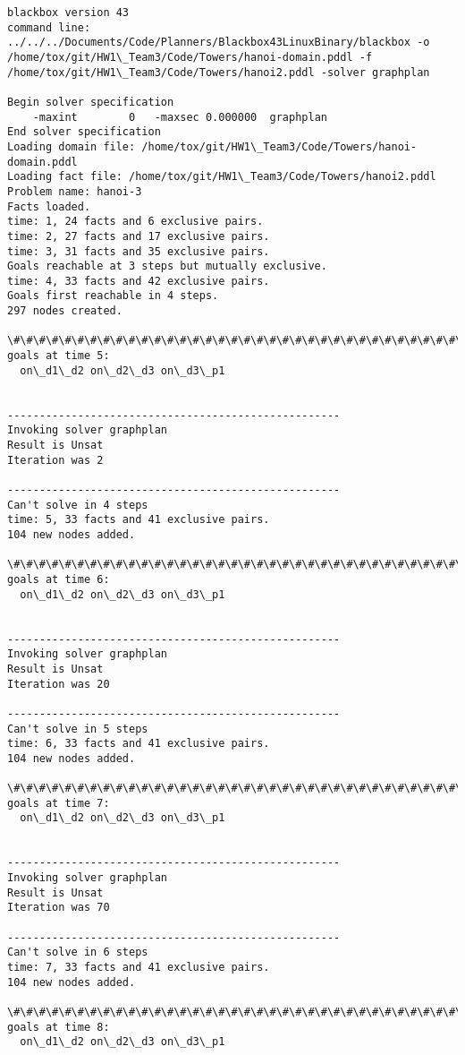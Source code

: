 \documentclass{article}
\begin{document}
    \begin{Verbatim}[commandchars=\\\{\}]
blackbox version 43
command line:  ../../../Documents/Code/Planners/Blackbox43LinuxBinary/blackbox -o /home/tox/git/HW1\_Team3/Code/Towers/hanoi-domain.pddl -f /home/tox/git/HW1\_Team3/Code/Towers/hanoi2.pddl -solver graphplan

Begin solver specification
    -maxint        0   -maxsec 0.000000  graphplan
End solver specification
Loading domain file: /home/tox/git/HW1\_Team3/Code/Towers/hanoi-domain.pddl
Loading fact file: /home/tox/git/HW1\_Team3/Code/Towers/hanoi2.pddl
Problem name: hanoi-3
Facts loaded.
time: 1, 24 facts and 6 exclusive pairs.
time: 2, 27 facts and 17 exclusive pairs.
time: 3, 31 facts and 35 exclusive pairs.
Goals reachable at 3 steps but mutually exclusive.
time: 4, 33 facts and 42 exclusive pairs.
Goals first reachable in 4 steps.
297 nodes created.

\#\#\#\#\#\#\#\#\#\#\#\#\#\#\#\#\#\#\#\#\#\#\#\#\#\#\#\#\#\#\#\#\#\#\#\#\#\#\#\#\#\#\#\#\#\#\#\#\#\#\#\#
goals at time 5:
  on\_d1\_d2 on\_d2\_d3 on\_d3\_p1 


----------------------------------------------------
Invoking solver graphplan
Result is Unsat
Iteration was 2

----------------------------------------------------
Can't solve in 4 steps
time: 5, 33 facts and 41 exclusive pairs.
104 new nodes added.

\#\#\#\#\#\#\#\#\#\#\#\#\#\#\#\#\#\#\#\#\#\#\#\#\#\#\#\#\#\#\#\#\#\#\#\#\#\#\#\#\#\#\#\#\#\#\#\#\#\#\#\#
goals at time 6:
  on\_d1\_d2 on\_d2\_d3 on\_d3\_p1 


----------------------------------------------------
Invoking solver graphplan
Result is Unsat
Iteration was 20

----------------------------------------------------
Can't solve in 5 steps
time: 6, 33 facts and 41 exclusive pairs.
104 new nodes added.

\#\#\#\#\#\#\#\#\#\#\#\#\#\#\#\#\#\#\#\#\#\#\#\#\#\#\#\#\#\#\#\#\#\#\#\#\#\#\#\#\#\#\#\#\#\#\#\#\#\#\#\#
goals at time 7:
  on\_d1\_d2 on\_d2\_d3 on\_d3\_p1 


----------------------------------------------------
Invoking solver graphplan
Result is Unsat
Iteration was 70

----------------------------------------------------
Can't solve in 6 steps
time: 7, 33 facts and 41 exclusive pairs.
104 new nodes added.

\#\#\#\#\#\#\#\#\#\#\#\#\#\#\#\#\#\#\#\#\#\#\#\#\#\#\#\#\#\#\#\#\#\#\#\#\#\#\#\#\#\#\#\#\#\#\#\#\#\#\#\#
goals at time 8:
  on\_d1\_d2 on\_d2\_d3 on\_d3\_p1 



\end{Verbatim}
\end{document}
